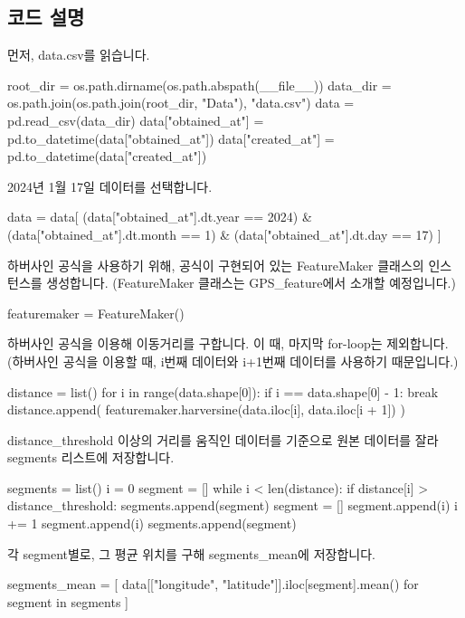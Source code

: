 \documentclass{oblivoir}
\begin{document}
  \subsection{코드 설명}
  먼저, data.csv를 읽습니다.
  \begin{python}[label={GPS_clean_1}]
    root_dir = os.path.dirname(os.path.abspath(__file__))
    data_dir = os.path.join(os.path.join(root_dir, "Data"), "data.csv")
    data = pd.read_csv(data_dir)
    data["obtained_at"] = pd.to_datetime(data["obtained_at"])
    data["created_at"] = pd.to_datetime(data["created_at"])
  \end{python}
  2024년 1월 17일 데이터를 선택합니다.
  \begin{python}[label={GPS_clean_2}]
    data = data[
      (data["obtained_at"].dt.year == 2024)
      & (data["obtained_at"].dt.month == 1)
      & (data["obtained_at"].dt.day == 17)
    ]
  \end{python}
  하버사인 공식을 사용하기 위해, 공식이 구현되어 있는 FeatureMaker 클래스의 인스턴스를 생성합니다.
  (FeatureMaker 클래스는 GPS\_feature에서 소개할 예정입니다.)
  \begin{python}[label={GPS_clean_3}]
    featuremaker = FeatureMaker()
  \end{python}
  하버사인 공식을 이용해 이동거리를 구합니다. 이 때, 마지막 for-loop는 제외합니다.
  (하버사인 공식을 이용할 때, i번째 데이터와 i+1번째 데이터를 사용하기 때문입니다.)
  \begin{python}[label={GPS_clean_4}]
    distance = list()
    for i in range(data.shape[0]):
        if i == data.shape[0] - 1:
            break
        distance.append(
            featuremaker.harversine(data.iloc[i], data.iloc[i + 1])
        )
  \end{python}
  distance\_threshold 이상의 거리를 움직인 데이터를 기준으로 원본 데이터를 잘라 segments 리스트에 저장합니다.
  \begin{python}[label={GPS_clean_5}]
    segments = list()
    i = 0
    segment = []
    while i < len(distance):
        if distance[i] > distance_threshold:
            segments.append(segment)
            segment = []
        segment.append(i)
        i += 1
    segment.append(i)
    segments.append(segment)
  \end{python}
  각 segment별로, 그 평균 위치를 구해 segments\_mean에 저장합니다.
  \begin{python}[label={GPS_clean_6}]
    segments_mean = [
      data[["longitude", "latitude"]].iloc[segment].mean()
      for segment in segments
    ]
  \end{python}
\end{document}
